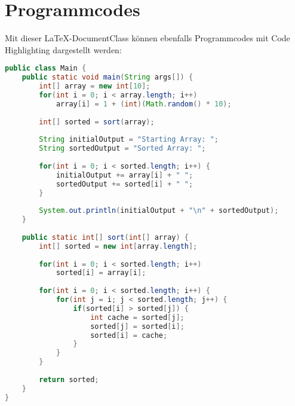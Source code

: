 \documentclass[a4paper]{uulm-document}
\begin{document}
\section{Programmcodes}
Mit dieser \LaTeX -DocumentClass können ebenfalls Programmcodes mit Code Highlighting dargestellt werden:
\begin{lstlisting}[language=Java]
public class Main {
    public static void main(String args[]) {
        int[] array = new int[10];
        for(int i = 0; i < array.length; i++)
            array[i] = 1 + (int)(Math.random() * 10);
        
        int[] sorted = sort(array);
        
        String initialOutput = "Starting Array: ";
        String sortedOutput = "Sorted Array: ";
      
        for(int i = 0; i < sorted.length; i++) {
            initialOutput += array[i] + " ";
            sortedOutput += sorted[i] + " ";
        }
      
        System.out.println(initialOutput + "\n" + sortedOutput);
    }
    
    public static int[] sort(int[] array) {
        int[] sorted = new int[array.length];
        
        for(int i = 0; i < sorted.length; i++)
            sorted[i] = array[i];
            
        for(int i = 0; i < sorted.length; i++) {
            for(int j = i; j < sorted.length; j++) {
                if(sorted[i] > sorted[j]) {
                    int cache = sorted[j];
                    sorted[j] = sorted[i];
                    sorted[i] = cache;
                }
            }
        }
        
        return sorted;
    } 
}
\end{lstlisting}
\end{document}
